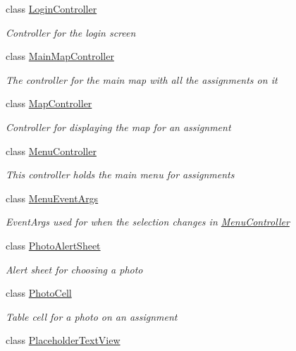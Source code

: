 \begin{DoxyCompactItemize}
class \hyperlink{class_field_service_1_1i_o_s_1_1_login_controller}{Login\+Controller}
\begin{DoxyCompactList}\small\item\em Controller for the login screen \end{DoxyCompactList}\item 
class \hyperlink{class_field_service_1_1i_o_s_1_1_main_map_controller}{Main\+Map\+Controller}
\begin{DoxyCompactList}\small\item\em The controller for the main map with all the assignments on it \end{DoxyCompactList}\item 
class \hyperlink{class_field_service_1_1i_o_s_1_1_map_controller}{Map\+Controller}
\begin{DoxyCompactList}\small\item\em Controller for displaying the map for an assignment \end{DoxyCompactList}\item 
class \hyperlink{class_field_service_1_1i_o_s_1_1_menu_controller}{Menu\+Controller}
\begin{DoxyCompactList}\small\item\em This controller holds the main menu for assignments \end{DoxyCompactList}\item 
class \hyperlink{class_field_service_1_1i_o_s_1_1_menu_event_args}{Menu\+Event\+Args}
\begin{DoxyCompactList}\small\item\em Event\+Args used for when the selection changes in \hyperlink{class_field_service_1_1i_o_s_1_1_menu_controller}{Menu\+Controller} \end{DoxyCompactList}\item 
class \hyperlink{class_field_service_1_1i_o_s_1_1_photo_alert_sheet}{Photo\+Alert\+Sheet}
\begin{DoxyCompactList}\small\item\em Alert sheet for choosing a photo \end{DoxyCompactList}\item 
class \hyperlink{class_field_service_1_1i_o_s_1_1_photo_cell}{Photo\+Cell}
\begin{DoxyCompactList}\small\item\em Table cell for a photo on an assignment \end{DoxyCompactList}\item 
class \hyperlink{class_field_service_1_1i_o_s_1_1_placeholder_text_view}{Placeholder\+Text\+View}

\end{DoxyCompactItemize}
